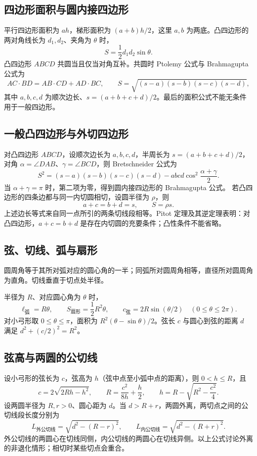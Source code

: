 \documentclass[../main.tex]{subfiles}
\begin{document}
\subsection{四边形面积与圆内接四边形}
平行四边形面积为 $ah$，梯形面积为 $(a+b)h/2$，这里 $a,b$ 为两底。凸四边形的两对角线长为 $d_1,d_2$、夹角为 $\theta$ 时，
\[
S=\frac12d_1d_2\sin\theta.
\]
凸四边形 $ABCD$ 共圆当且仅当对角互补。共圆时 Ptolemy 公式与 Brahmagupta 公式为
\[
AC\cdot BD=AB\cdot CD+AD\cdot BC,\qquad
S=\sqrt{(s-a)(s-b)(s-c)(s-d)},
\]
其中 $a,b,c,d$ 为顺次边长、$s=(a+b+c+d)/2$。最后的面积公式不能无条件用于一般四边形。
\subsection{一般凸四边形与外切四边形}
对凸四边形 $ABCD$，设顺次边长为 $a,b,c,d$，半周长为 $s=(a+b+c+d)/2$，对角 $\alpha=\angle DAB$、$\gamma=\angle BCD$，则 Bretschneider 公式为
\[
S^2=(s-a)(s-b)(s-c)(s-d)
-abcd\cos^2\frac{\alpha+\gamma}{2}.
\]
当 $\alpha+\gamma=\pi$ 时，第二项为零，得到圆内接四边形的 Brahmagupta 公式。
若凸四边形的四条边都与同一内切圆相切，设圆半径为 $\rho$，则
\[
a+c=b+d=s,\qquad S=\rho s.
\]
上述边长等式来自同一点所引的两条切线段相等。Pitot 定理及其逆定理表明：对凸四边形，$a+c=b+d$ 是存在内切圆的充要条件；凸性条件不能省略。
\subsection{弦、切线、弧与扇形}
圆周角等于其所对弧对应的圆心角的一半；同弧所对圆周角相等，直径所对圆周角为直角。切线垂直于切点处半径。
\par\begin{samepage}
半径为 $R$、对应圆心角为 $\theta$ 时，
\[
\ell_{\text{弧}}=R\theta,\qquad S_{\text{扇形}}=\frac12R^2\theta,
\qquad c_{\text{弦}}=2R\sin(\theta/2)\quad(0\le\theta\le2\pi).
\]
对小弓形取 $0\le\theta\le\pi$，面积为 $R^2(\theta-\sin\theta)/2$。弦长 $c$ 与圆心到弦的距离 $d$ 满足 $d^2+(c/2)^2=R^2$。
\par\end{samepage}
\subsection{弦高与两圆的公切线}
设小弓形的弦长为 $c$，弦高为 $h$（弦中点至小弧中点的距离），则 $0<h\le R$，且
\[
c=2\sqrt{2Rh-h^2},\qquad
R=\frac{c^2}{8h}+\frac h2,\qquad
h=R-\sqrt{R^2-\frac{c^2}{4}}.
\]
设两圆半径为 $R,r>0$、圆心距为 $d$。当 $d>R+r$，两圆外离，两切点之间的公切线段长度分别为
\[
L_{\text{外公切线}}=\sqrt{d^2-(R-r)^2},\qquad
L_{\text{内公切线}}=\sqrt{d^2-(R+r)^2}.
\]
外公切线的两圆心在切线同侧，内公切线的两圆心在切线异侧。以上公式讨论外离的非退化情形；相切时某些切点会重合。
\end{document}

